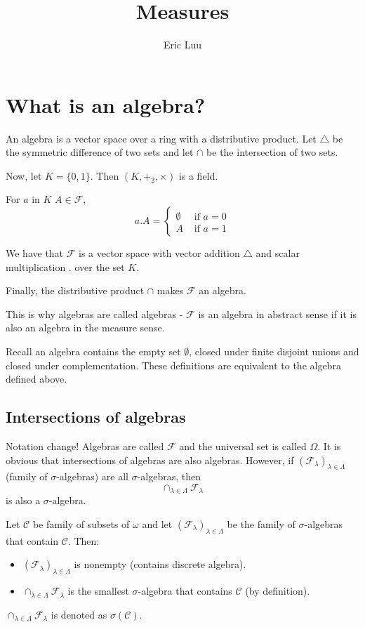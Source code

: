 \documentclass{article}
\title{Measures}
\author{Eric Luu}
\theoremstyle{definition}
\numberwithin{theorem}{section}
\numberwithin{equation}{section}
\begin{document}
\maketitle
\section{What is an algebra?}
An algebra is a vector space over a ring with a distributive product. 
Let $\triangle$ be the symmetric difference of two sets and let $\cap$ be the intersection of two sets. 

Now, let $K = \lbrace 0, 1 \rbrace$. Then $(K, +_2, \times)$ is a field. 

For $a$ in $K$ $A \in \mathcal{F}$,\begin{equation}
	 a . A = 
	 \begin{cases}
	 	\emptyset &\text{ if } a = 0\\
	 	A &\text{ if } a = 1
	 \end{cases}
\end{equation} 

We have that $\mathcal{F}$ is a vector space with vector addition $\triangle$ and scalar multiplication $.$ over the set $K$. 

Finally, the distributive product $\cap$ makes $\mathcal{F}$ an algebra. 

This is why algebras are called algebras - $\mathcal{F}$ is an algebra in abstract sense if it is also an algebra in the measure sense.

Recall an algebra contains the empty set $\emptyset$, closed under finite disjoint unions and closed under complementation. These definitions are equivalent to the algebra defined above.

\subsection{Intersections of algebras}
Notation change! Algebras are called $\mathcal{F}$ and the universal set is called $\Omega$. 
It is obvious that intersections of algebras are also algebras. However, if $\left(\mathcal{F}_\lambda \right)_{\lambda \in \Lambda}$ (family of $\sigma$-algebras) are all $\sigma$-algebras, then
\begin{equation}
	\cap_{\lambda \in \Lambda} \mathcal{F}_\lambda
\end{equation} 
is also a $\sigma$-algebra. 

Let $\mathcal{C}$ be family of subsets of $\omega$ and let $\left(\mathcal{F}_\lambda \right)_{\lambda \in \Lambda}$ be the family of $\sigma$-algebras that contain $\mathcal{C}$. Then:
\begin{itemize}
	\item $\left(\mathcal{F}_\lambda \right)_{\lambda \in \Lambda}$ is nonempty (contains discrete algebra).
	\item $\cap_{\lambda \in \Lambda} \mathcal{F}_\lambda$ is the smallest $\sigma$-algebra that contains $\mathcal{C}$ (by definition).
\end{itemize}
$\cap_{\lambda \in \Lambda} \mathcal{F}_\lambda$ is denoted as $\sigma(\mathcal{C})$. 
\end{document}
